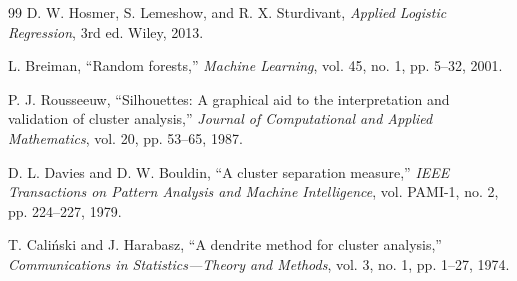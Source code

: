 \documentclass[conference]{IEEEtran}
\begin{document}
\begin{thebibliography}{99}
D. W. Hosmer, S. Lemeshow, and R. X. Sturdivant, \textit{Applied Logistic Regression}, 3rd ed. Wiley, 2013.

L. Breiman, ``Random forests,'' \textit{Machine Learning}, vol. 45, no. 1, pp. 5--32, 2001.

P. J. Rousseeuw, ``Silhouettes: A graphical aid to the interpretation and validation of cluster analysis,'' \textit{Journal of Computational and Applied Mathematics}, vol. 20, pp. 53--65, 1987.

D. L. Davies and D. W. Bouldin, ``A cluster separation measure,'' \textit{IEEE Transactions on Pattern Analysis and Machine Intelligence}, vol. PAMI-1, no. 2, pp. 224--227, 1979.

T. Cali\'{n}ski and J. Harabasz, ``A dendrite method for cluster analysis,'' \textit{Communications in Statistics---Theory and Methods}, vol. 3, no. 1, pp. 1--27, 1974.

\end{thebibliography}
\end{document}
